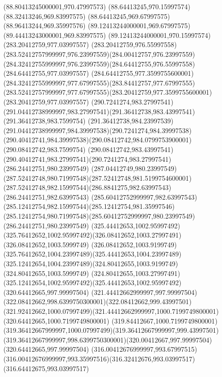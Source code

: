 {{	\closepath
	\moveto(88.80413245000001,970.47997573)
	\lineto(88.64413245,970.15997574)
	\lineto(88.32413246,969.83997575)
	\lineto(88.64413245,969.67997575)
	\lineto(88.96413244,969.35997576)
	\lineto(89.12413244000001,969.67997575)
	\lineto(89.44413243000001,969.83997575)
	\lineto(89.12413244000001,970.15997574)
	\closepath
	\moveto(283.20412759,977.03997557)
	\curveto(283.20412759,976.55997558)(283.52412757999997,976.23997559)(284.00412757,976.23997559)
	\curveto(284.32412755999997,976.23997559)(284.64412755,976.55997558)(284.64412755,977.03997557)
	\curveto(284.64412755,977.3599755600001)(284.32412755999997,977.67997555)(283.84412757,977.67997555)
	\curveto(283.52412757999997,977.67997555)(283.20412759,977.3599755600001)(283.20412759,977.03997557)
	\closepath
	\moveto(290.7241274,983.27997541)
	\curveto(291.04412738999997,983.27997541)(291.36412738,983.43997541)(291.36412738,983.7599754)
	\curveto(291.36412738,984.23997539)(291.04412738999997,984.39997538)(290.7241274,984.39997538)
	\curveto(290.40412741,984.39997538)(290.08412742,984.0799753900001)(290.08412742,983.7599754)
	\curveto(290.08412742,983.43997541)(290.40412741,983.27997541)(290.7241274,983.27997541)
	\closepath
	\moveto(286.24412751,980.23997549)
	\curveto(287.04412749,980.23997549)(287.52412748,980.71997548)(287.52412748,981.5199754600001)
	\curveto(287.52412748,982.15997544)(286.8841275,982.63997543)(286.24412751,982.63997543)
	\curveto(285.60412752999997,982.63997543)(285.12412754,982.15997544)(285.12412754,981.35997546)
	\curveto(285.12412754,980.71997548)(285.60412752999997,980.23997549)(286.24412751,980.23997549)
	\closepath
	\moveto(325.44412653,1002.95997492)
	\curveto(325.76412652,1002.95997492)(326.08412652,1003.27997491)(326.08412652,1003.5999749)
	\curveto(326.08412652,1003.9199749)(325.76412652,1004.23997489)(325.44412653,1004.23997489)
	\curveto(325.12412654,1004.23997489)(324.80412655,1003.9199749)(324.80412655,1003.5999749)
	\curveto(324.80412655,1003.27997491)(325.12412654,1002.95997492)(325.44412653,1002.95997492)
	\closepath
	\moveto(320.64412665,997.99997504)
	\curveto(321.44412662999997,997.99997504)(322.08412662,998.6399750300001)(322.08412662,999.43997501)
	\curveto(321.92412662,1000.07997499)(321.44412662999997,1000.7199749800001)(320.64412665,1000.7199749800001)
	\curveto(319.84412667,1000.7199749800001)(319.36412667999997,1000.07997499)(319.36412667999997,999.43997501)
	\curveto(319.36412667999997,998.6399750300001)(320.00412667,997.99997504)(320.64412665,997.99997504)
	\closepath
	\moveto(316.00412676999997,993.67997515)
	\curveto(316.00412676999997,993.35997516)(316.32412676,993.03997517)(316.64412675,993.03997517)
}}
